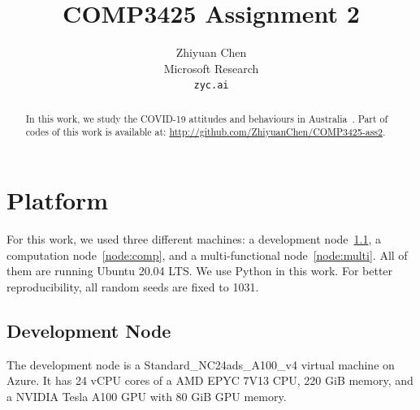 \documentclass[11pt,twocolumn,letterpaper]{article}
\begin{document}
\title{COMP3425 Assignment 2}

\author{
    Zhiyuan Chen\\
    Microsoft Research\\  %
    {\tt\small zyc.ai}
}


\maketitle

\begin{abstract}
In this work, we study the COVID-19 attitudes and behaviours in Australia~\cite{data}.
Part of codes of this work is available at: \url{http://github.com/ZhiyuanChen/COMP3425-ass2}.
\end{abstract}

\section{Platform}

For this work, we used three different machines: a development node~\ref{node:dev}, a computation node~\ref{node:comp}, and a multi-functional node~\ref{node:multi}.
All of them are running Ubuntu 20.04 LTS.
We use Python in this work.
For better reproducibility, all random seeds are fixed to 1031.

\subsection{Development Node}\label{node:dev}

The development node is a Standard\_NC24ads\_A100\_v4 virtual machine on Azure.
It has 24 vCPU cores of a AMD EPYC 7V13 CPU, 220 GiB memory, and a NVIDIA Tesla A100 GPU with 80 GiB GPU memory.
\end{document}
